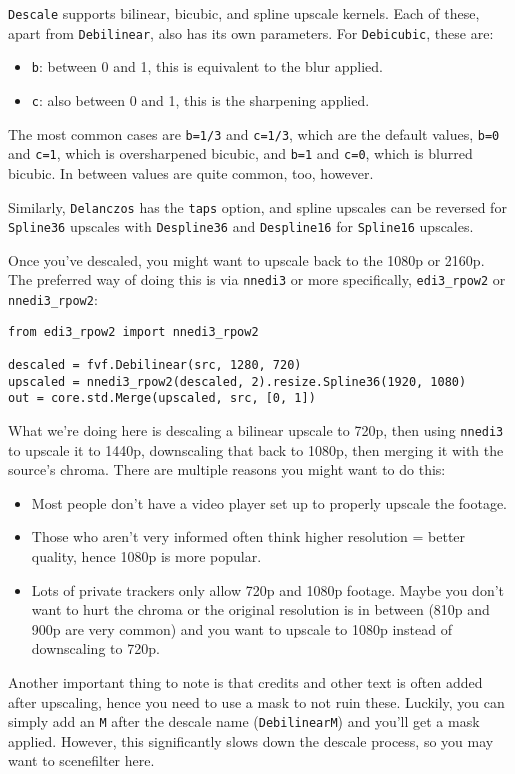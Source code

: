 \documentclass{scrartcl}
\begin{document}
\texttt{Descale} supports bilinear, bicubic, and spline upscale kernels.
Each of these, apart from \texttt{Debilinear}, also has its own parameters.  For \texttt{Debicubic}, these are:
\begin{itemize}
	\item \texttt{b}: between 0 and 1, this is equivalent to the blur applied.
	\item \texttt{c}: also between 0 and 1, this is the sharpening applied.
\end{itemize}
The most common cases are \texttt{b=1/3} and \texttt{c=1/3}, which are the default values, \texttt{b=0} and \texttt{c=1}, which is oversharpened bicubic, and \texttt{b=1} and \texttt{c=0}, which is blurred bicubic.
In between values are quite common, too, however.

Similarly, \texttt{Delanczos} has the \texttt{taps} option, and spline upscales can be reversed for \texttt{Spline36} upscales with \texttt{Despline36} and \texttt{Despline16} for \texttt{Spline16} upscales.

Once you've descaled, you might want to upscale back to the 1080p or 2160p.  The preferred way of doing this is via \texttt{nnedi3} or more specifically, \texttt{edi3\_rpow2} or \texttt{nnedi3\_rpow2}:
\begin{lstlisting}
from edi3_rpow2 import nnedi3_rpow2

descaled = fvf.Debilinear(src, 1280, 720)
upscaled = nnedi3_rpow2(descaled, 2).resize.Spline36(1920, 1080)
out = core.std.Merge(upscaled, src, [0, 1])
\end{lstlisting}
What we're doing here is descaling a bilinear upscale to 720p, then using \texttt{nnedi3} to upscale it to 1440p, downscaling that back to 1080p, then merging it with the source's chroma.
There are multiple reasons you might want to do this:
\begin{itemize}
	\item Most people don't have a video player set up to properly upscale the footage.
	\item Those who aren't very informed often think higher resolution = better quality, hence 1080p is more popular.
	\item Lots of private trackers only allow 720p and 1080p footage.  Maybe you don't want to hurt the chroma or the original resolution is in between (810p and 900p are very common) and you want to upscale to 1080p instead of downscaling to 720p.
\end{itemize}

Another important thing to note is that credits and other text is often added after upscaling, hence you need to use a mask to not ruin these.
Luckily, you can simply add an \texttt{M} after the descale name (\texttt{DebilinearM}) and you'll get a mask applied.
However, this significantly slows down the descale process, so you may want to scenefilter here.
\end{document}
